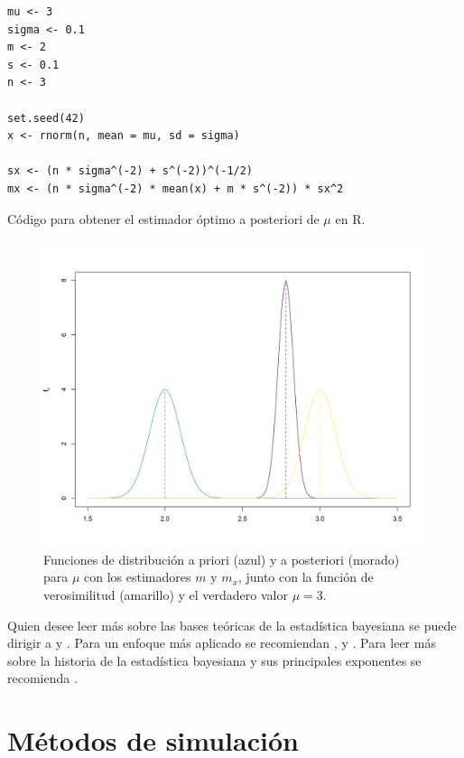 \documentclass[11pt,a4paper]{article}
\begin{document}
\begin{table}[htb]
\begin{lstlisting}
mu <- 3
sigma <- 0.1
m <- 2
s <- 0.1
n <- 3

set.seed(42)
x <- rnorm(n, mean = mu, sd = sigma)

sx <- (n * sigma^(-2) + s^(-2))^(-1/2)
mx <- (n * sigma^(-2) * mean(x) + m * s^(-2)) * sx^2
\end{lstlisting}
\caption{Código para obtener el estimador óptimo a posteriori de $\mu$ en R.}
\label{cod:mu_posterior}
\end{table}

\begin{figure}[htb]
\centering\includegraphics[width=12cm]{pointwise_estimation.png}
\caption{Funciones de distribución a priori (azul) y a posteriori (morado) para $\mu$ con los estimadores $m$ y $m_x$, junto con la función de verosimilitud (amarillo) y el verdadero valor $\mu = 3$.}
\label{fig:pointwise}
\end{figure}

Quien desee leer más sobre las bases teóricas de la estadística bayesiana se puede dirigir a \citet{bernardo} y \citet{mendoza}. Para un enfoque más aplicado se recomiendan \citet{gelman}, \citet{kruschke} y \citet{albert}. Para leer más sobre la historia de la estadística bayesiana y sus principales exponentes se recomienda \citet{bertsch}.

\newpage
\clearpage

\section{Métodos de simulación}
\label{simulacion}
\end{document}
